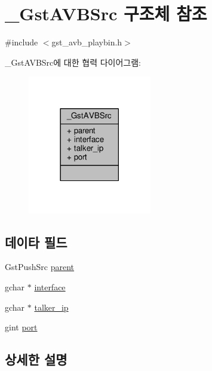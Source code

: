 \hypertarget{struct___gst_a_v_b_src}{}\section{\+\_\+\+Gst\+A\+V\+B\+Src 구조체 참조}
\label{struct___gst_a_v_b_src}


{\ttfamily \#include $<$gst\+\_\+avb\+\_\+playbin.\+h$>$}



\+\_\+\+Gst\+A\+V\+B\+Src에 대한 협력 다이어그램\+:
\nopagebreak
\begin{figure}[H]
\begin{center}
\leavevmode
\includegraphics[width=153pt]{struct___gst_a_v_b_src__coll__graph}
\end{center}
\end{figure}
\subsection*{데이타 필드}
\begin{DoxyCompactItemize}
\item 
Gst\+Push\+Src \hyperlink{struct___gst_a_v_b_src_a63157cc62a0e2c6d3184738ae366bbf7}{parent}
\item 
gchar $\ast$ \hyperlink{struct___gst_a_v_b_src_a796aab0c0ba78c463684181ccbcac365}{interface}
\item 
gchar $\ast$ \hyperlink{struct___gst_a_v_b_src_a917022df7bed008cf4778d3ecd14ffc1}{talker\+\_\+ip}
\item 
gint \hyperlink{struct___gst_a_v_b_src_af501f53114411bfa8e4f46f98af2b5f4}{port}
\end{DoxyCompactItemize}


\subsection{상세한 설명}


